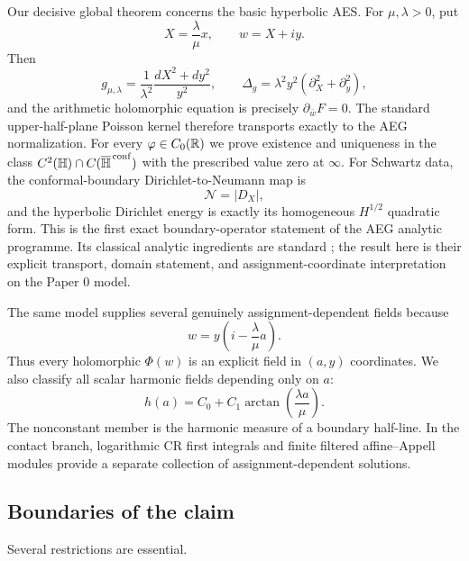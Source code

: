 Our decisive global theorem concerns the basic hyperbolic AES.  For
$\mu,\lambda>0$, put
\[
 X=\frac{\lambda}{\mu}x,
 \qquad
 w=X+iy.
\]
Then
\[
 g_{\mu,\lambda}
 =\frac1{\lambda^2}\frac{dX^2+dy^2}{y^2},
 \qquad
 \Delta_g=\lambda^2y^2(\partial_X^2+\partial_y^2),
\]
and the arithmetic holomorphic equation is precisely
$\partial_{\bar w}F=0$.  The standard upper-half-plane Poisson kernel therefore
transports exactly to the AEG normalization.  For every
$\varphi\in C_0(\mathbb{R})$ we prove existence and uniqueness in the class
$C^2(\mathbb{H})\cap C(\overline{\mathbb{H}}^{\,\mathrm{conf}})$ with the prescribed value zero at
$\infty$.  For Schwartz data,
the conformal-boundary Dirichlet-to-Neumann map is
\[
 \mathcal N=|D_X|,
\]
and the hyperbolic Dirichlet energy is exactly its homogeneous
$H^{1/2}$ quadratic form.  This is the first exact boundary-operator statement of
the AEG analytic programme.  Its classical analytic ingredients are
standard \cite{Ahlfors1979ComplexAnalysis,CaffarelliSilvestre2007Extension}; the
result here is their explicit transport, domain statement, and assignment-coordinate
interpretation on the Paper 0 model.

The same model supplies several genuinely assignment-dependent fields because
\begin{equation}\label{eq:intro-w-assignment}
 w=y\left(i-\frac{\lambda}{\mu}a\right).
\end{equation}
Thus every holomorphic $\Phi(w)$ is an explicit field in $(a,y)$ coordinates.
We also classify all scalar harmonic fields depending only on $a$:
\[
 h(a)=C_0+C_1\arctan\!\left(\frac{\lambda a}{\mu}\right).
\]
The nonconstant member is the harmonic measure of a boundary half-line.  In the
contact branch, logarithmic CR first integrals and finite filtered affine--Appell
modules provide a separate collection of assignment-dependent solutions.

\subsection{Boundaries of the claim}

Several restrictions are essential.

